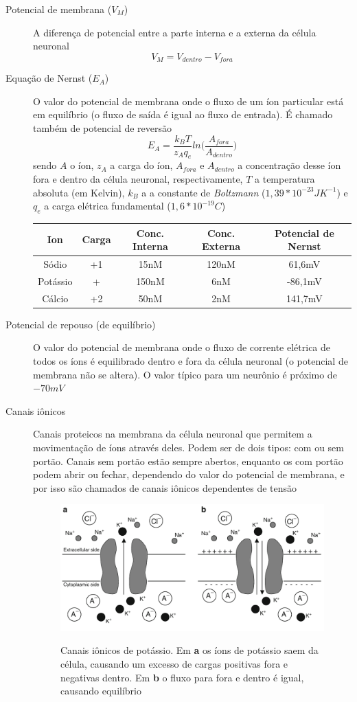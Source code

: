 \begin{description}
	\item[Potencial de membrana ($V_M$)] A diferença de potencial entre a parte interna e a externa da célula neuronal
	$$V_M=V_{dentro}-V_{fora}$$
	\item[Equação de Nernst ($E_A$)] O valor do potencial de membrana onde o fluxo de um íon particular está em equilíbrio (o fluxo de saída é igual ao fluxo de entrada). É chamado também de potencial de reversão
	$$
	E_A=\frac{k_BT}{z_Aq_e}ln\Big(\frac{A_{fora}}{A_{dentro}}\Big)
	$$
	sendo $A$ o íon, $z_A$ a carga do íon, $A_{fora}$ e $A_{dentro}$ a concentração desse íon fora e dentro da célula neuronal, respectivamente, $T$ a temperatura absoluta (em Kelvin), $k_B$ a a constante de \textit{Boltzmann} ($1,39*10^{-23}JK^{-1}$) e $q_e$ a carga elétrica fundamental ($1,6*10^{-19}C$)
	
	\begin{tabular}{ccccc}
		\hline
		Ion & Carga & Conc. Interna & Conc. Externa & Potencial de Nernst \\
		\hline
		Sódio & +1 & 15nM & 120nM & 61,6mV \\
		
		Potássio & + & 150nM & 6nM & -86,1mV \\
		
		Cálcio & +2 & 50nM & 2nM & 141,7mV \\
		\hline
	\end{tabular}
	
	\item[Potencial de repouso (de equilíbrio)] O valor do potencial de membrana onde o fluxo de corrente elétrica de todos os íons é equilibrado dentro e fora da célula neuronal (o potencial de membrana não se altera). O valor típico para um neurônio é próximo de $-70mV$
	\item[Canais iônicos] Canais proteicos na membrana da célula neuronal que permitem a movimentação de íons através deles. Podem ser de dois tipos: com ou sem portão. Canais sem portão estão sempre abertos, enquanto os com portão podem abrir ou fechar, dependendo do valor do potencial de membrana, e por isso são chamados de canais iônicos dependentes de tensão
	
	\begin{figure}[htb!]
		\centering
		\caption{Canais iônicos de potássio. Em \textbf{a} os íons de potássio saem da célula, causando um excesso de cargas positivas fora e negativas dentro. Em \textbf{b} o fluxo para fora e dentro é igual, causando equilíbrio}
		\label{fig:canaisions}
		\includegraphics[width=0.7\linewidth]{figs/canais_ions}
		\cite{ermentrout_mathematical_2010}
	\end{figure}
	

\end{description}
